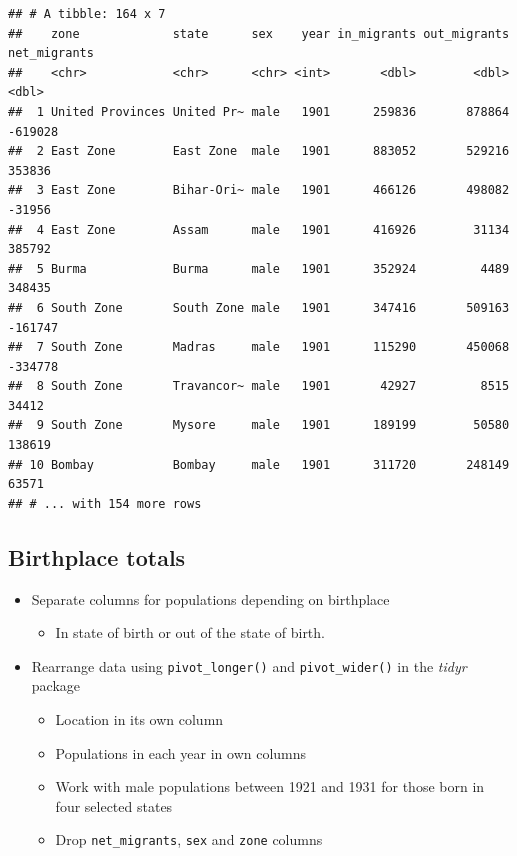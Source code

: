 \documentclass[
]{book}
\providecommand{\tightlist}{%
  \setlength{\itemsep}{0pt}\setlength{\parskip}{0pt}}
\begin{document}
\begin{verbatim}
## # A tibble: 164 x 7
##    zone             state      sex    year in_migrants out_migrants net_migrants
##    <chr>            <chr>      <chr> <int>       <dbl>        <dbl>        <dbl>
##  1 United Provinces United Pr~ male   1901      259836       878864      -619028
##  2 East Zone        East Zone  male   1901      883052       529216       353836
##  3 East Zone        Bihar-Ori~ male   1901      466126       498082       -31956
##  4 East Zone        Assam      male   1901      416926        31134       385792
##  5 Burma            Burma      male   1901      352924         4489       348435
##  6 South Zone       South Zone male   1901      347416       509163      -161747
##  7 South Zone       Madras     male   1901      115290       450068      -334778
##  8 South Zone       Travancor~ male   1901       42927         8515        34412
##  9 South Zone       Mysore     male   1901      189199        50580       138619
## 10 Bombay           Bombay     male   1901      311720       248149        63571
## # ... with 154 more rows
\end{verbatim}

\hypertarget{birthplace-totals-1}{%
\subsection{Birthplace totals}\label{birthplace-totals-1}}

\begin{itemize}
\tightlist
\item
  Separate columns for populations depending on birthplace

  \begin{itemize}
  \tightlist
  \item
    In state of birth or out of the state of birth.
  \end{itemize}
\item
  Rearrange data using \texttt{pivot\_longer()} and \texttt{pivot\_wider()} in the \emph{tidyr} package

  \begin{itemize}
  \tightlist
  \item
    Location in its own column
  \item
    Populations in each year in own columns
  \item
    Work with male populations between 1921 and 1931 for those born in four selected states
  \item
    Drop \texttt{net\_migrants}, \texttt{sex} and \texttt{zone} columns
  \end{itemize}
\end{itemize}
\end{document}
